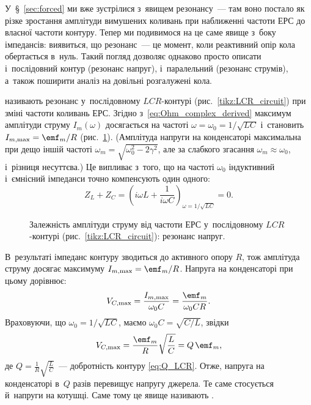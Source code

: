 У~\S~\ref{sec:forced} ми вже зустрілися з~явищем резонансу~--- там воно постало як різке зростання амплітуди вимушених коливань при наближенні частоти ЕРС до власної частоти контуру. Тепер ми подивимося на це саме явище з~боку імпедансів: виявиться, що резонанс~--- це момент, коли реактивний опір кола обертається в~нуль. Такий погляд дозволяє однаково просто описати і~послідовний контур (резонанс напруг), і~паралельний (резонанс струмів), а~також поширити аналіз на довільні розгалужені кола.


 називають резонанс у~послідовному
$LCR$-кон\-ту\-рі (рис.~\ref{tikz:LCR_circuit}) при зміні частоти коливань ЕРС. Згідно з~\eqref{eq:Ohm_complex_derived} максимум амплітуди струму $I_m(\omega)$ досягається на частоті $\omega = \omega_0 = 1/\sqrt{LC}$ і~становить $I_{m,\max} = \emf_m/R$ (рис.~\ref{tikz:current_resonance}). (Амплітуда напруги на конденсаторі максимальна при дещо іншій частоті $\omega_m=\sqrt{\omega_0^2-2\gamma^2}$, але за слабкого згасання $\omega_m\approx\omega_0$, і~різниця несуттєва.) Це випливає з~того, що на частоті $\omega_0$ індуктивний і~ємнісний імпеданси точно компенсують один одного:
\begin{equation*}
	Z_L + Z_C = \left(i\omega L + \frac{1}{i\omega C}\right)_{\omega = 1/\sqrt{LC}} = 0.
\end{equation*}

\begin{figure}
	\centering
	\caption{Залежність амплітуди струму від частоти ЕРС у~послідовному $LCR$-контурі (рис.~\ref{tikz:LCR_circuit}): резонанс напруг.}
	\label{tikz:current_resonance}
\end{figure}

В~результаті імпеданс контуру зводиться до активного опору $R$, тож амплітуда струму досягає максимуму $I_{m,\max} = \emf_m/R$. Напруга на конденсаторі при цьому дорівнює:
\begin{equation*}
	V_{C,\max} = \frac{I_{m,\max}}{\omega_0 C} = \frac{\emf_m}{\omega_0 C R}.
\end{equation*}
Враховуючи, що $\omega_0 = 1/\sqrt{LC}$, маємо $\omega_0 C = \sqrt{C/L}$, звідки
\begin{equation*}
	V_{C,\max} = \frac{\emf_m}{R}\sqrt{\frac{L}{C}} = Q\,\emf_m,
\end{equation*}
де $Q = \frac{1}{R}\sqrt{\frac{L}{C}}$~--- добротність контуру \eqref{eq:Q_LCR}. Отже, напруга на конденсаторі в~$Q$ разів перевищує напругу джерела. Те саме стосується й~напруги на котушці. Саме тому це явище називають .

